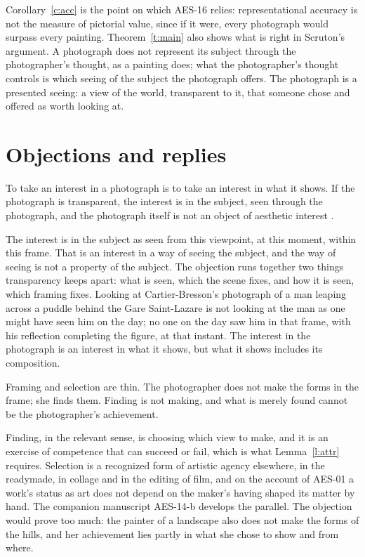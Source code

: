 \documentclass{situationist-preprint}
\begin{document}
Corollary~\ref{c:acc} is the point on which AES-16 relies: representational accuracy is not the measure of pictorial value, since if it were, every photograph would surpass every painting. Theorem~\ref{t:main} also shows what is right in Scruton's argument. A photograph does not represent its subject through the photographer's thought, as a painting does; what the photographer's thought controls is which seeing of the subject the photograph offers. The photograph is a presented seeing: a view of the world, transparent to it, that someone chose and offered as worth looking at.

\section{Objections and replies}

\begin{objection}\label{o:subj}
To take an interest in a photograph is to take an interest in what it shows. If the photograph is transparent, the interest is in the subject, seen through the photograph, and the photograph itself is not an object of aesthetic interest \citep{Scruton1981}.
\end{objection}

\begin{reply}
The interest is in the subject as seen from this viewpoint, at this moment, within this frame. That is an interest in a way of seeing the subject, and the way of seeing is not a property of the subject. The objection runs together two things transparency keeps apart: what is seen, which the scene fixes, and how it is seen, which framing fixes. Looking at Cartier-Bresson's photograph of a man leaping across a puddle behind the Gare Saint-Lazare is not looking at the man as one might have seen him on the day; no one on the day saw him in that frame, with his reflection completing the figure, at that instant. The interest in the photograph is an interest in what it shows, but what it shows includes its composition.
\end{reply}

\begin{objection}\label{o:thin}
Framing and selection are thin. The photographer does not make the forms in the frame; she finds them. Finding is not making, and what is merely found cannot be the photographer's achievement.
\end{objection}

\begin{reply}
Finding, in the relevant sense, is choosing which view to make, and it is an exercise of competence that can succeed or fail, which is what Lemma~\ref{l:attr} requires. Selection is a recognized form of artistic agency elsewhere, in the readymade, in collage and in the editing of film, and on the account of AES-01 a work's status as art does not depend on the maker's having shaped its matter by hand. The companion manuscript AES-14-b develops the parallel. The objection would prove too much: the painter of a landscape also does not make the forms of the hills, and her achievement lies partly in what she chose to show and from where.
\end{reply}
\end{document}
